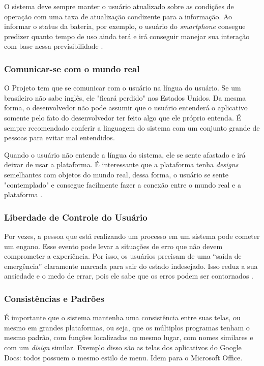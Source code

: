 O sistema deve sempre manter o usuário atualizado sobre as condições de operação com uma taxa de atualização condizente para a informação. Ao informar o status da bateria, por exemplo, o usuário do \textit{smartphone} consegue predizer quanto tempo de uso ainda terá e irá conseguir manejar sua interação com base nessa previsibilidade \cite{site:nielsen}.

\subsubsection{Comunicar-se com o mundo real}
O Projeto tem que se comunicar com o usuário na língua do usuário. Se um brasileiro não sabe inglês, ele "ficará perdido" nos Estados Unidos. Da mesma forma, o desenvolvedor não pode assumir que o usuário entenderá o aplicativo somente pelo fato do desenvolvedor ter feito algo que ele próprio entenda. É sempre recomendado conferir a linguagem do sistema com um conjunto grande de pessoas para evitar mal entendidos.

Quando o usuário não entende a língua do sistema, ele se sente afastado e irá deixar de usar a plataforma. É interessante que a plataforma tenha \textit{designs} semelhantes com objetos do mundo real, dessa forma, o usuário se sente "contemplado" e consegue facilmente fazer a conexão entre o mundo real e a plataforma \cite{site:nielsenRealWorld}.

\subsubsection{Liberdade de Controle do Usuário}

Por vezes, a pessoa que está realizando um processo em um sistema pode cometer um engano. Esse evento pode levar a situações de erro que não devem comprometer a experiência. Por isso, os usuários precisam de uma “saída de emergência” claramente marcada para sair do estado indesejado. Isso reduz a sua ansiedade e o medo de errar, pois ele sabe que os erros podem ser contornados \cite{BarbosaEtAl2021InteracaoHumanoComputadorExperiencia}.

\subsubsection{Consistências e Padrões}

É importante que o sistema mantenha uma consistência entre suas telas, ou mesmo em grandes plataformas, ou seja, que os múltiplos programas tenham o mesmo padrão, com funções localizadas no mesmo lugar, com nomes similares e com um \textit{disign} similar. Exemplo disso são as telas dos aplicativos do Google Docs: todos possuem o mesmo estilo de menu. Idem para o Microsoft Office.

